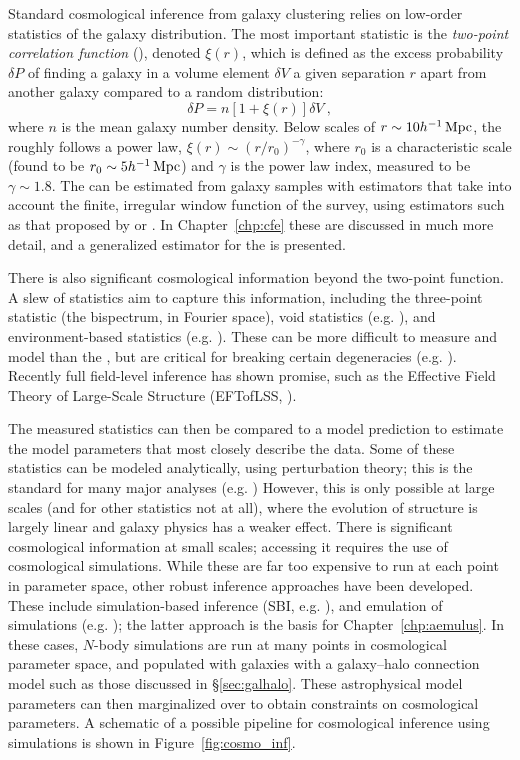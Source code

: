 Standard cosmological inference from galaxy clustering relies on low-order statistics of the galaxy distribution.
The most important statistic is the \emph{two-point correlation function} (\cf), denoted $\xi(r)$, which is defined as the excess probability $\delta P$ of finding a galaxy in a volume element $\delta V$ a given separation $r$ apart from another galaxy compared to a random distribution:
\begin{equation}
    \delta P = n[1+\xi(r)]\delta V ~,
\end{equation}
where $n$ is the mean galaxy number density.
Below scales of $r \sim 10 h^{-1}\,\mathrm{Mpc}$, the \cf roughly follows a power law, $\xi(r) \sim (r/r_0)^{-\gamma}$, where $r_0$ is a characteristic scale (found to be $r_0 \sim 5 h^{-1}\,\mathrm{Mpc}$) and $\gamma$ is the power law index, measured to be $\gamma \sim 1.8$.
The \cf can be estimated from galaxy samples with estimators that take into account the finite, irregular window function of the survey, using estimators such as that proposed by \cite{DavisPeebles1983} or \cite{LandySzalay1993}.
In Chapter~\ref{chp:cfe} these are discussed in much more detail, and a generalized estimator for the \cf is presented.

There is also significant cosmological information beyond the two-point function.
A slew of statistics aim to capture this information, including the three-point statistic (the bispectrum, in Fourier space), void statistics (e.g. \citealt{sheth_hierarchy_2004}), and environment-based statistics (e.g. \citealt{Sheth2004,tinker_void_2007}).
These can be more difficult to measure and model than the \cf, but are critical for breaking certain degeneracies (e.g. \citealt{WhitePadmanabhan2009}).
Recently full field-level inference has shown promise, such as the Effective Field Theory of Large-Scale Structure (EFTofLSS, \citealt{baumann_cosmological_2012}).

The measured statistics can then be compared to a model prediction to estimate the model parameters that most closely describe the data.
Some of these statistics can be modeled analytically, using perturbation theory; this is the standard for many major analyses (e.g. \citealt{tegmark_cosmological_2006}) 
However, this is only possible at large scales (and for other statistics not at all), where the evolution of structure is largely linear and galaxy physics has a weaker effect.
There is significant cosmological information at small scales; accessing it requires the use of cosmological simulations.
While these are far too expensive to run at each point in parameter space, other robust inference approaches have been developed. 
These include simulation-based inference (SBI, e.g. \citealt{hahn_rm_2022}), and emulation of simulations (e.g. \citealt{Heitmann2009, Lawrence2017, Angulo2021}); the latter approach is the basis for Chapter~\ref{chp:aemulus}.
In these cases, $N$-body simulations are run at many points in cosmological parameter space, and populated with galaxies with a galaxy--halo connection model such as those discussed in \S\ref{sec:galhalo}.
These astrophysical model parameters can then marginalized over to obtain constraints on cosmological parameters.
A schematic of a possible pipeline for cosmological inference using simulations is shown in Figure~\ref{fig:cosmo_inf}.

